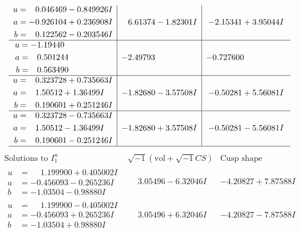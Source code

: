 \documentclass[1p]{elsarticle_modified}
\theoremstyle{definition}
\newcommand{\I}{\sqrt{-1}}
\begin{document}
$$\begin{array}{c|c|c}
\begin{aligned}
u &= \phantom{-}0.046469 - 0.849926 I \\
a &= -0.926104 + 0.236908 I \\
b &= \phantom{-}0.122562 - 0.203546 I\end{aligned}
 & \phantom{-}6.61374 - 1.82301 I & -2.15341 + 3.95044 I \\ \hline\begin{aligned}
u &= -1.19440\phantom{ +0.000000I} \\
a &= \phantom{-}0.501244\phantom{ +0.000000I} \\
b &= \phantom{-}0.563490\phantom{ +0.000000I}\end{aligned}
 & -2.49793\phantom{ +0.000000I} & -0.727600\phantom{ +0.000000I} \\ \hline\begin{aligned}
u &= \phantom{-}0.323728 + 0.735663 I \\
a &= \phantom{-}1.50512 + 1.36499 I \\
b &= \phantom{-}0.190601 + 0.251246 I\end{aligned}
 & -1.82680 - 3.57508 I & -0.50281 + 5.56081 I \\ \hline\begin{aligned}
u &= \phantom{-}0.323728 - 0.735663 I \\
a &= \phantom{-}1.50512 - 1.36499 I \\
b &= \phantom{-}0.190601 - 0.251246 I\end{aligned}
 & -1.82680 + 3.57508 I & -0.50281 - 5.56081 I\\
 \hline 
 \end{array}$$\newpage$$\begin{array}{c|c|c}  
\text{Solutions to }I^u_{1}& \I (\text{vol} + \sqrt{-1}CS) & \text{Cusp shape}\\
 \hline 
\begin{aligned}
u &= \phantom{-}1.199900 + 0.405002 I \\
a &= -0.456093 - 0.265236 I \\
b &= -1.03504 - 0.98880 I\end{aligned}
 & \phantom{-}3.05496 - 6.32046 I & -4.20827 + 7.87588 I \\ \hline\begin{aligned}
u &= \phantom{-}1.199900 - 0.405002 I \\
a &= -0.456093 + 0.265236 I \\
b &= -1.03504 + 0.98880 I\end{aligned}
 & \phantom{-}3.05496 + 6.32046 I & -4.20827 - 7.87588 I \\ \hline\begin{aligned}

\end{aligned}
\end{array}$$
\end{document}
